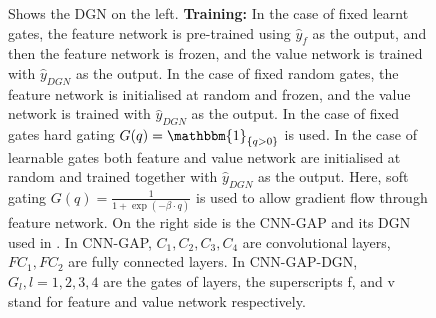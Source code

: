 \begin{figure}
\centering
\begin{minipage}{0.9\columnwidth}
\centering
\begin{minipage}{0.45\columnwidth}
\resizebox{1.0\columnwidth}{!}{

}
\end{minipage}
\begin{minipage}{0.54\columnwidth}
\resizebox{1.0\columnwidth}{!}{

}
\end{minipage}
\end{minipage}
\caption{\small{Shows the DGN on the left. \textbf{Training:} In the case of fixed learnt gates, the feature network is pre-trained using $\hat{y}_f$ as the output, and then the feature network is frozen, and the value network is trained with $\hat{y}_{DGN}$ as the output. In the case of fixed random gates, the feature network is initialised at random and frozen, and the value network is trained with $\hat{y}_{DGN}$ as the output. In the case of fixed gates hard gating $G(q)=\mathbbm{1}_{\{q>0\}}$ is used. In the case of learnable gates both feature and value network are initialised at random and trained together with $\hat{y}_{DGN}$ as the output. Here, soft gating $G(q)=\frac{1}{1+\exp(-\beta\cdot q)}$ is used to allow gradient flow through feature network. On the right side is the CNN-GAP and its DGN used in \citep{npk}. In CNN-GAP, $C_1,C_2,C_3,C_4$ are convolutional layers, $FC_1,FC_2$ are fully connected layers. In CNN-GAP-DGN, $G_l, l=1,2,3,4$ are the gates of layers, the superscripts f, and v stand for feature and value network respectively.}}
\label{fig:dgn}
\end{figure}

